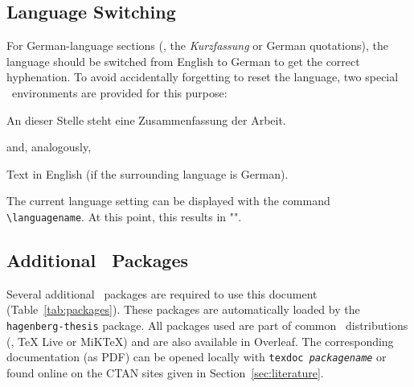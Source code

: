 \subsection{Language Switching}
\label{sec:language-switching}

For German-language sections (\eg, the \emph{Kurzfassung} or German quotations), the
language should be switched from English to German to get the correct
hyphenation. To avoid accidentally forgetting to reset the language, two special
\latex\ environments are provided for this purpose:
%
\begin{LaTeXCode}[numbers=none]
\begin{german}
    An dieser Stelle steht eine Zusammenfassung der Arbeit.
\end{german}
\end{LaTeXCode}
%
and, analogously,
%
\begin{LaTeXCode}[numbers=none]
\begin{english}
    Text in English (if the surrounding language is German).
\end{english}
\end{LaTeXCode}
%
The current language setting can be displayed with the command
\verb!\languagename!. At this point, this results in
"\texttt{\languagename}".



\subsection{Additional \latex\ Packages}

Several additional \latex\ packages are required to use this document
(Table~\ref{tab:packages}). These packages are automatically loaded by the
\texttt{hagenberg-thesis} package. All packages used are part of common \latex\
distributions (\eg, TeX Live or MiKTeX) and are also available in
\textsf{Overleaf}. The corresponding documentation (as PDF) can be opened
locally with \texttt{texdoc \emph{packagename}} or found online on the CTAN
sites given in Section~\ref{sec:literature}.

